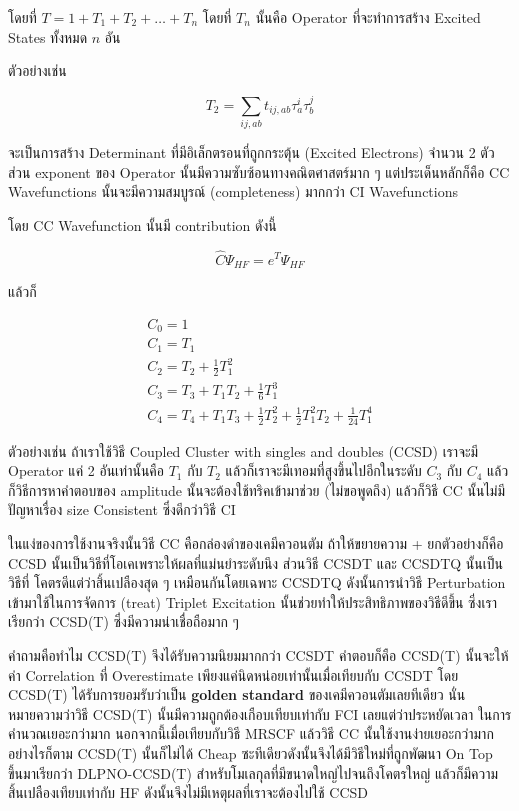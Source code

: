 \noindent โดยที่ $T = 1 + T_{1} + T_{2} + \dots + T_{n}$ โดยที่ $T_{n}$ นั้นคือ
Operator ที่จะทำการสร้าง Excited States ทั้งหมด $n$ อัน

ตัวอย่างเช่น

\begin{equation}
    T_{2} = \sum_{ij,ab} t_{ij,ab} \tau^{i}_{a} \tau^{j}_{b}
\end{equation}

จะเป็นการสร้าง Determinant ที่มีอิเล็กตรอนที่ถูกกระตุ้น (Excited Electrons) จำนวน 2 ตัว
ส่วน exponent ของ Operator นั้นมีความซับซ้อนทางคณิตศาสตร์มาก ๆ แต่ประเด็นหลักก็คือ
CC Wavefunctions นั้นจะมีความสมบูรณ์ (completeness) มากกว่า CI Wavefunctions

โดย CC Wavefunction นั้นมี contribution ดังนี้

\begin{equation}
    \hat{C} \Psi_{HF} = e^{T} \Psi_{HF}
\end{equation}

แล้วก็

\begin{gather}
    C_{0} = 1 \\
    C_{1} = T_{1} \\
    C_{2} = T_{2} + \frac{1}{2}T^{2}_{1} \\
    C_{3} = T_{3} + T_{1}T_{2} + \frac{1}{6}T^{3}_{1} \\
    C_{4} = T_{4} + T_{1}T_{3} + \frac{1}{2}T^{2}_{2}
    + \frac{1}{2}T^{2}_{1} T_{2} + \frac{1}{24}T^{4}_{1}
\end{gather}

ตัวอย่างเช่น ถ้าเราใช้วิธี Coupled Cluster with singles and doubles (CCSD) เราจะมี
Operator แค่ 2 อันเท่านั้นคือ $T_{1}$ กับ $T_{2}$ แล้วก็เราจะมีเทอมที่สูงขึ้นไปอีกในระดับ
$C_{3}$ กับ $C_{4}$ แล้วก็วิธีการหาคำตอบของ amplitude นั้นจะต้องใช้ทริคเข้ามาช่วย
(ไม่ขอพูดถึง) แล้วก็วิธี CC นั้นไม่มีปัญหาเรื่อง size Consistent ซึ่งดีกว่าวิธี CI

ในแง่ของการใช้งานจริงนั้นวิธี CC คือกล่องดำของเคมีควอนตัม ถ้าให้ขยายความ + ยกตัวอย่างก็คือ
CCSD นั้นเป็นวิธีที่โอเคเพราะให้ผลที่แม่นยำระดับนึง ส่วนวิธี CCSDT และ CCSDTQ นั้นเป็นวิธีที่%
โคตรดีแต่ว่าสิ้นเปลืองสุด ๆ เหมือนกันโดยเฉพาะ CCSDTQ ดังนั้นการนำวิธี Perturbation
เข้ามาใช้ในการจัดการ (treat) Triplet Excitation นั้นช่วยทำให้ประสิทธิภาพของวิธีดีขึ้น
ซึ่งเราเรียกว่า CCSD(T) ซึ่งมีความน่าเชื่อถือมาก ๆ

คำถามคือทำไม CCSD(T) จึงได้รับความนิยมมากกว่า CCSDT คำตอบก็คือ CCSD(T) นั้นจะให้ค่า
Correlation ที่ Overestimate เพียงแค่นิดหน่อยเท่านั้นเมื่อเทียบกับ CCSDT โดย CCSD(T)
ได้รับการยอมรับว่าเป็น \textbf{golden standard} ของเคมีควอนตัมเลยทีเดียว
นั่นหมายความว่าวิธี CCSD(T) นั้นมีความถูกต้องเกือบเทียบเท่ากับ FCI เลยแต่ว่าประหยัดเวลา%
ในการคำนวณเยอะกว่ามาก นอกจากนี้เมื่อเทียบกับวิธี MRSCF แล้ววิธี CC นั้นใช้งานง่ายเยอะกว่ามาก
อย่างไรก็ตาม CCSD(T) นั้นก็ไม่ได้ Cheap ซะทีเดียวดังนั้นจึงได้มีวิธีใหม่ที่ถูกพัฒนา On Top
ขึ้นมาเรียกว่า DLPNO-CCSD(T) สำหรับโมเลกุลที่มีขนาดใหญ่ไปจนถึงโคตรใหญ่ แล้วก็มีความ%
สิ้นเปลืองเทียบเท่ากับ HF ดังนั้นจึงไม่มีเหตุผลที่เราจะต้องไปใช้ CCSD

